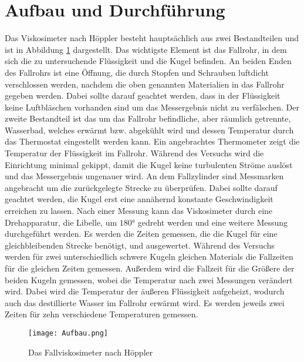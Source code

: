 \newpage
\section{Aufbau und Durchführung}
Das Viskosimeter nach Höppler besteht hauptsächlich aus zwei Bestandteilen und ist in Abbildung \ref{fig:a} dargestellt.
Das wichtigste Element ist das Fallrohr, in dem sich die zu untersuchende Flüssigkeit und die Kugel befinden.
An beiden Enden des Fallrohrs ist eine Öffnung, die durch Stopfen und Schrauben luftdicht verschlossen werden, nachdem die oben genannten Materialien in das Fallrohr gegeben werden.
Dabei sollte darauf geachtet werden, dass in der Flüssigkeit keine Luftbläschen vorhanden sind um das Messergebnis nicht zu verfälschen.
Der zweite Bestandteil ist das um das Fallrohr befindliche, aber räumlich getrennte, Wasserbad, welches erwärmt bzw. abgekühlt wird und dessen Temperatur durch das Thermostat eingestellt werden kann.
Ein angebrachtes Thermometer zeigt die Temperatur der Flüssigkeit im Fallrohr.
Während des Versuchs wird die Einrichtung minimal gekippt, damit die Kugel keine turbulenten Ströme auslöst und das Messergebnis ungenauer wird.
An dem Fallzylinder sind Messmarken angebracht um die zurückgelegte Strecke zu überprüfen.
Dabei sollte darauf geachtet werden, die Kugel erst eine annähernd konstante Geschwindigkeit erreichen zu lassen.
Nach einer Messung kann das Viskosimeter durch eine Drehapparatur, die Libelle, um $180°$ gedreht werden und eine weitere Messung durchgeführt werden.
Es werden die Zeiten gemessen, die die Kugel für eine gleichbleibenden Strecke benötigt, und ausgewertet.
Während des Versuchs werden für zwei unterschiedlich schwere Kugeln gleichen Materials die Fallzeiten für die gleichen Zeiten gemessen.
Außerdem wird die Fallzeit für die Größere der beiden Kugeln gemessen, wobei die Temperatur nach zwei Messungen verändert wird.
Dabei wird die Temperatur der äußeren Flüssigkeit aufgeheizt, wodurch auch das destillierte Wasser im Fallrohr erwärmt wird.
Es werden jeweils zwei Zeiten für zehn verschiedene Temperaturen gemessen.
\begin{figure}[H]
    \centering
    \caption{Das Fallviskosimeter nach Höppler}
    \texttt{[image: Aufbau.png]}
    \label{fig:a}
\end{figure}

